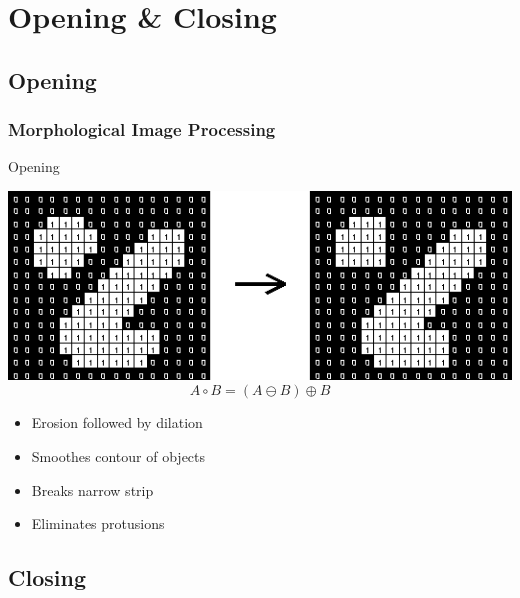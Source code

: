\documentclass{beamer}
\begin{document}
\section{Opening \& Closing}

\subsection{Opening}

\begin{frame}
\frametitle{Morphological Image Processing}
\begin{block}{Opening}\scriptsize
  \begin{center}
    \includegraphics[height=0.2\textheight]{images/opening.png}
    $$A \circ B = (A \ominus B) \oplus B$$
  \end{center}  
  \begin{itemize}
    \item Erosion followed by dilation
    \item Smoothes contour of objects
    \item Breaks narrow strip
    \item Eliminates protusions
  \end{itemize}
\end{block}
\end{frame}

\subsection{Closing}
\end{document}
